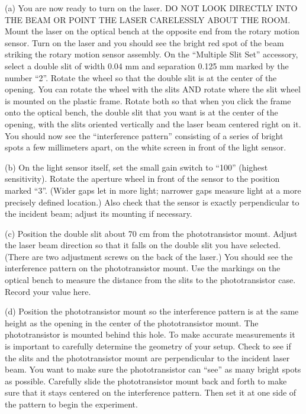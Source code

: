 (a) You are now ready to turn on the laser. DO NOT LOOK DIRECTLY INTO
THE BEAM OR POINT THE LASER CARELESSLY ABOUT THE ROOM. Mount the laser on the 
optical bench at the opposite end from the rotary motion sensor. Turn on the
laser and you should see the bright red spot of the beam striking
the rotary motion sensor assembly. On the ``Multiple Slit Set'' accessory, 
select a double slit of width 0.04 mm and separation 0.125 mm marked by the number “2”. 
Rotate the 
wheel so that the double slit is at the center of the opening.
You can rotate the wheel with the slits AND rotate where the slit wheel is mounted
on the plastic frame. Rotate both so that when you click the frame onto the optical bench, the double slit that
you want is at the center of the opening, with the slits oriented vertically and the laser beam centered right on
it. You should now see the “interference pattern” consisting of a series of bright spots a few millimeters apart,
on the white screen in front of the light sensor.

(b) On the light sensor itself, set the small gain switch to “100” (highest sensitivity). Rotate the aperture wheel
in front of the sensor to the position marked “3”. (Wider gaps let in more light; narrower gaps measure light
at a more precisely defined location.) Also check that the sensor is exactly perpendicular to the incident beam;
adjust its mounting if necessary.

(c) Position the double slit about 70 cm from the phototransistor mount. Adjust 
the laser beam direction so that it falls on the double slit you have selected. 
(There are two adjustment screws on the back of the laser.) 
You should see the interference pattern on the phototransistor mount. 
Use the markings on the optical bench to measure the distance from the slits
to the phototransistor case.
Record your value here.
\vspace{10mm}

(d) Position the phototransistor mount so the interference pattern
is at the same height as the opening in the center of the phototransistor mount. 
The phototransistor is mounted behind this hole. 
To make accurate measurements it is important to carefully determine the geometry of your setup. 
Check to see if the slits and the phototransistor mount are perpendicular to the incident
laser beam.  You want to make sure the phototransistor can {}``see'' as many
bright spots as possible. Carefully slide the phototransistor mount 
back and forth to make sure that it stays centered on the interference pattern. 
Then set it at one side of the pattern to begin the experiment.

